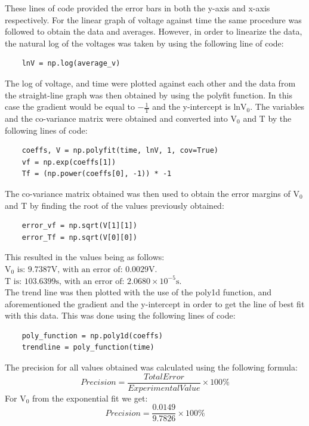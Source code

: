 \documentclass[12pt, a4paper]{article}
\begin{document}
These lines of code provided the error bars in both the y-axis and x-axis respectively. 
For the linear graph of voltage against time the same procedure was followed to obtain the data and averages. However, in order to linearize the data, the natural log of the voltages was taken by using the following line of code:
\begin{verbatim}
    lnV = np.log(average_v) 
\end{verbatim}
The log of voltage, and time were plotted against each other and the data from the straight-line graph was then obtained by using the polyfit function. In this case the gradient would be equal to $-\frac{1}{\text{T}}$ and the y-intercept is $\text{lnV}_0$. The variables and the co-variance matrix were obtained and converted into $\text{V}_0$ and T by the following lines of code:
\begin{verbatim}
    coeffs, V = np.polyfit(time, lnV, 1, cov=True)
    vf = np.exp(coeffs[1]) 
    Tf = (np.power(coeffs[0], -1)) * -1
\end{verbatim}
The co-variance matrix obtained was then used to obtain the error margins of $\text{V}_0$ and T by finding the root of the values previously obtained:
\begin{verbatim}
    error_vf = np.sqrt(V[1][1]) 
    error_Tf = np.sqrt(V[0][0]) 
\end{verbatim}
This resulted in the values being as follows:\\
\indent$\text{V}_0 \text{ is: 9.7387V, with an error of: 0.0029V.}$\\
\indent$\text{T} \text{ is: 103.6399s, with an error of: 2.0680}{\times}10^{-5}\text{s.}$\\
The trend line was then plotted with the use of the poly1d function, and aforementioned the gradient and the y-intercept in order to get the line of best fit with this data. This was done using the following lines of code:
\begin{verbatim}
    poly_function = np.poly1d(coeffs)
    trendline = poly_function(time)
\end{verbatim}
The precision for all values obtained was calculated using the following formula:
\begin{equation}
    Precision = \frac{Total Error}{Experimental Value}{\times}100\%
\end{equation}
For $\text{V}_0$ from the exponential fit we get:
\begin{equation*}
    Precision = \frac{0.0149}{9.7826}{\times} 100\%
\end{equation*}
\end{document}
